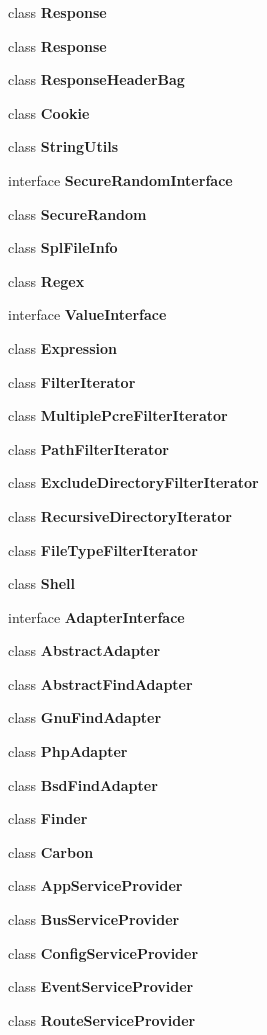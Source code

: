 \begin{DoxyCompactItemize}
class {\bf Response}
\item 
class {\bf Response}
\item 
class {\bf Response\+Header\+Bag}
\item 
class {\bf Cookie}
\item 
class {\bf String\+Utils}
\item 
interface {\bf Secure\+Random\+Interface}
\item 
class {\bf Secure\+Random}
\item 
class {\bf Spl\+File\+Info}
\item 
class {\bf Regex}
\item 
interface {\bf Value\+Interface}
\item 
class {\bf Expression}
\item 
class {\bf Filter\+Iterator}
\item 
class {\bf Multiple\+Pcre\+Filter\+Iterator}
\item 
class {\bf Path\+Filter\+Iterator}
\item 
class {\bf Exclude\+Directory\+Filter\+Iterator}
\item 
class {\bf Recursive\+Directory\+Iterator}
\item 
class {\bf File\+Type\+Filter\+Iterator}
\item 
class {\bf Shell}
\item 
interface {\bf Adapter\+Interface}
\item 
class {\bf Abstract\+Adapter}
\item 
class {\bf Abstract\+Find\+Adapter}
\item 
class {\bf Gnu\+Find\+Adapter}
\item 
class {\bf Php\+Adapter}
\item 
class {\bf Bsd\+Find\+Adapter}
\item 
class {\bf Finder}
\item 
class {\bf Carbon}
\item 
class {\bf App\+Service\+Provider}
\item 
class {\bf Bus\+Service\+Provider}
\item 
class {\bf Config\+Service\+Provider}
\item 
class {\bf Event\+Service\+Provider}
\item 
class {\bf Route\+Service\+Provider}
\end{DoxyCompactItemize}
